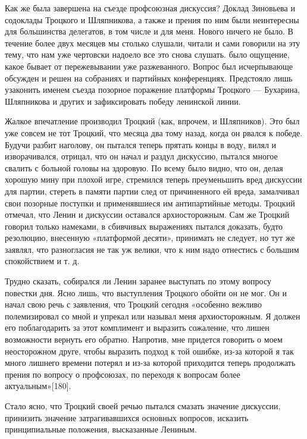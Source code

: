 \documentclass[12pt, a4paper, openany]{book}
\begin{document}
Как же была завершена на съезде профсоюзная дискуссия? Доклад Зиновьева и содоклады Троцкого и Шляпникова, а также и прения по ним были неинтересны для большинства делегатов, в том числе и для меня. Нового ничего не было. В течение более двух месяцев мы столько слушали, читали и сами говорили на эту тему, что нам уже чертовски надоело все это снова слушать. было ощущение, какое бывает от пережевывании уже разжеванного. Вопрос был исчерпывающе обсужден и решен на собраниях и партийных конференциях. Предстояло лишь узаконить именем съезда позорное поражение платформы Троцкого — Бухарина, Шляпникова и других и зафиксировать победу ленинской линии.

Жалкое впечатление производил Троцкий (как, впрочем, и Шляпников). Это был уже совсем не тот Троцкий, что месяца два тому назад, когда он рвался к победе. Будучи разбит наголову, он пытался теперь прятать концы в воду, вилял и изворачивался, отрицал, что он начал и раздул дискуссию, пытался многое свалить с больной головы на здоровую. По всему было видно, что он, делая хорошую мину при плохой игре, стремился теперь преуменьшить вред дискуссии для партии, стереть в памяти партии след от причиненного ей вреда, замалчивал свои позорные поступки и применявшиеся им антипартийные методы. Троцкий отмечал, что Ленин и дискуссии оставался архиосторожным. Сам же Троцкий говорил только намеками, в сбивчивых выражениях пытался доказать, будто резолюцию, внесенную «платформой десяти», принимать не следует, но тут же заявлял, что разногласия не так уж велики, что к ним надо отнестись с большим спокойствием и т. д.

Трудно сказать, собирался ли Ленин заранее выступать по этому вопросу повестки дня. Ясно лишь, что выступления Троцкого обойти он не мог. Он и начал свою речь с заявления, что Троцкий сегодня «особенно вежливо полемизировал со мной и упрекал или называл меня архиосторожным. Я должен его поблагодарить за этот комплимент и выразить сожаление, что лишен возможности вернуть его обратно. Напротив, мне придется говорить о моем неосторожном друге, чтобы выразить подход к той ошибке, из-за которой я так много лишнего времени потерял и из-за которой приходится теперь продолжать прения по вопросу о профсоюзах, по переходя к вопросам более актуальным»[180].

Стало ясно, что Троцкий своей речью пытался смазать значение дискуссии, принизить значение затрагивавшихся основных вопросов, исказить принципиальные положения, высказанные Лениным.
\end{document}
